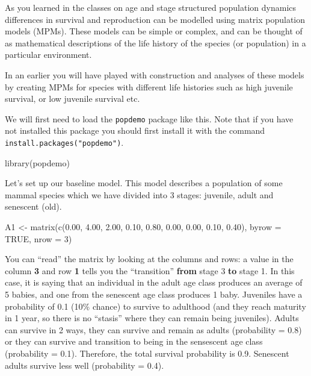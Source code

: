 \documentclass[
  a4paper]{book}
\newenvironment{Shaded}{\begin{snugshade}}{\end{snugshade}}
\newcommand{\AttributeTok}[1]{\textcolor[rgb]{0.77,0.63,0.00}{#1}}
\newcommand{\ConstantTok}[1]{\textcolor[rgb]{0.00,0.00,0.00}{#1}}
\newcommand{\DecValTok}[1]{\textcolor[rgb]{0.00,0.00,0.81}{#1}}
\newcommand{\FloatTok}[1]{\textcolor[rgb]{0.00,0.00,0.81}{#1}}
\newcommand{\FunctionTok}[1]{\textcolor[rgb]{0.00,0.00,0.00}{#1}}
\newcommand{\NormalTok}[1]{#1}
\newcommand{\OtherTok}[1]{\textcolor[rgb]{0.56,0.35,0.01}{#1}}
\begin{document}
As you learned in the classes on age and stage structured population
dynamics differences in survival and reproduction can be modelled using
matrix population models (MPMs). These models can be simple or complex,
and can be thought of as mathematical descriptions of the life history
of the species (or population) in a particular environment.

In an earlier you will have played with construction and analyses of
these models by creating MPMs for species with different life histories
such as high juvenile survival, or low juvenile survival etc.

We will first need to load the \texttt{popdemo} package like this. Note
that if you have not installed this package you should first install it
with the command \texttt{install.packages("popdemo")}.

\begin{Shaded}
\begin{Highlighting}[]
\FunctionTok{library}\NormalTok{(popdemo)}
\end{Highlighting}
\end{Shaded}

Let's set up our baseline model. This model describes a population of
some mammal species which we have divided into 3 stages: juvenile, adult
and senescent (old).

\begin{Shaded}
\begin{Highlighting}[]
\NormalTok{A1 }\OtherTok{\textless{}{-}} \FunctionTok{matrix}\NormalTok{(}\FunctionTok{c}\NormalTok{(}\FloatTok{0.00}\NormalTok{, }\FloatTok{4.00}\NormalTok{, }\FloatTok{2.00}\NormalTok{, }
               \FloatTok{0.10}\NormalTok{, }\FloatTok{0.80}\NormalTok{, }\FloatTok{0.00}\NormalTok{, }
               \FloatTok{0.00}\NormalTok{, }\FloatTok{0.10}\NormalTok{, }\FloatTok{0.40}\NormalTok{), }
            \AttributeTok{byrow =} \ConstantTok{TRUE}\NormalTok{, }\AttributeTok{nrow =} \DecValTok{3}\NormalTok{)}
\end{Highlighting}
\end{Shaded}

You can ``read'' the matrix by looking at the columns and rows: a value
in the column \textbf{3} and row \textbf{1} tells you the ``transition''
\textbf{from} stage 3 \textbf{to} stage 1. In this case, it is saying
that an individual in the adult age class produces an average of 5
babies, and one from the senescent age class produces 1 baby. Juveniles
have a probability of 0.1 (10\% chance) to survive to adulthood (and
they reach maturity in 1 year, so there is no ``stasis'' where they can
remain being juveniles). Adults can survive in 2 ways, they can survive
and remain as adults (probability = 0.8) or they can survive and
transition to being in the sensescent age class (probability = 0.1).
Therefore, the total survival probability is 0.9. Senescent adults
survive less well (probability = 0.4).
\end{document}
